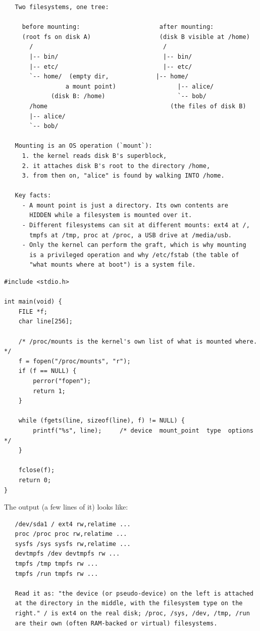 \begin{verbatim}
   Two filesystems, one tree:

     before mounting:                      after mounting:
     (root fs on disk A)                   (disk B visible at /home)
       /                                    /
       |-- bin/                             |-- bin/
       |-- etc/                             |-- etc/
       `-- home/  (empty dir,             |-- home/
                 a mount point)                 |-- alice/
             (disk B: /home)                    `-- bob/
       /home                                  (the files of disk B)
       |-- alice/
       `-- bob/

   Mounting is an OS operation (`mount`):
     1. the kernel reads disk B's superblock,
     2. it attaches disk B's root to the directory /home,
     3. from then on, "alice" is found by walking INTO /home.

   Key facts:
     - A mount point is just a directory. Its own contents are
       HIDDEN while a filesystem is mounted over it.
     - Different filesystems can sit at different mounts: ext4 at /,
       tmpfs at /tmp, proc at /proc, a USB drive at /media/usb.
     - Only the kernel can perform the graft, which is why mounting
       is a privileged operation and why /etc/fstab (the table of
       "what mounts where at boot") is a system file.
\end{verbatim}

\begin{lstlisting}[caption={Reading the mount table from inside a program.}]
#include <stdio.h>

int main(void) {
    FILE *f;
    char line[256];

    /* /proc/mounts is the kernel's own list of what is mounted where. */
    f = fopen("/proc/mounts", "r");
    if (f == NULL) {
        perror("fopen");
        return 1;
    }

    while (fgets(line, sizeof(line), f) != NULL) {
        printf("%s", line);     /* device  mount_point  type  options */
    }

    fclose(f);
    return 0;
}
\end{lstlisting}

The output (a few lines of it) looks like:

\begin{verbatim}
   /dev/sda1 / ext4 rw,relatime ...
   proc /proc proc rw,relatime ...
   sysfs /sys sysfs rw,relatime ...
   devtmpfs /dev devtmpfs rw ...
   tmpfs /tmp tmpfs rw ...
   tmpfs /run tmpfs rw ...

   Read it as: "the device (or pseudo-device) on the left is attached
   at the directory in the middle, with the filesystem type on the
   right." / is ext4 on the real disk; /proc, /sys, /dev, /tmp, /run
   are their own (often RAM-backed or virtual) filesystems.
\end{verbatim}

